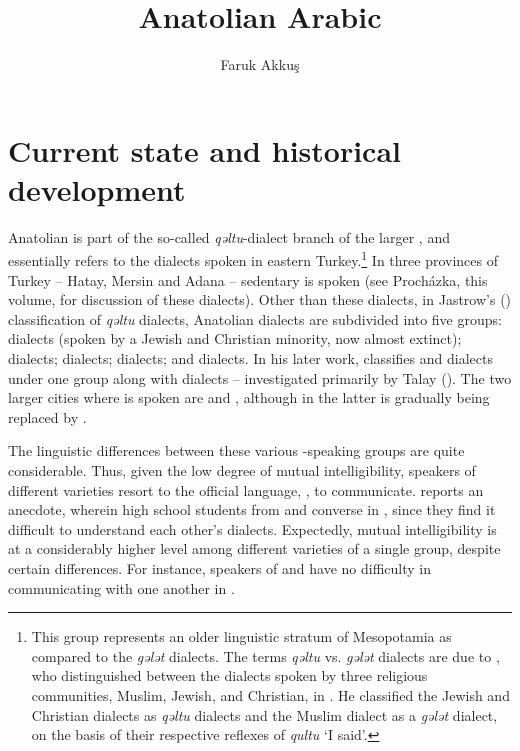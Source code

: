 \documentclass[output=paper]{langsci/langscibook}
\title{Anatolian Arabic}
\author{Faruk Akkuş\affiliation{University of Pennsylvania}}
\begin{document}
\maketitle

\section{Current state and historical development}

Anatolian  is part of the so-called \textit{qəltu}-dialect branch of the larger  , and essentially refers to the  dialects spoken in eastern Turkey.\footnote{This group represents an older linguistic stratum of Mesopotamia as compared to the \textit{gələt} dialects. The terms \textit{qəltu} vs. \textit{gələt} dialects are due to \cite{Blanc1964}, who distinguished between the  dialects spoken by three religious communities,
Muslim, Jewish, and Christian, in . He classified the Jewish and
Christian dialects as \textit{qəltu} dialects and the Muslim dialect as a \textit{gələt} dialect, on the basis of their respective reflexes of   \textit{qultu} `I said'.} In three provinces of Turkey -- Hatay, Mersin and Adana --  sedentary  is spoken (see Proch\'{a}zka, this volume, for discussion of these dialects). Other than these dialects, in Jastrow's (\citeyear{Jastrow1978}) classification of  \textit{qəltu} dialects, Anatolian  dialects are subdivided into five groups:
 dialects (spoken by a Jewish and Christian minority, now almost extinct);  dialects;  dialects;  dialects; and  dialects.
In his later work, \citet{Jastrow2011anatolian} classifies  and  dialects under one group along with  dialects -- investigated primarily by Talay (\citeyear{Talay2001,Talay2002}). The two larger cities where  is spoken are  and , although in the latter  is gradually being replaced by .

The linguistic differences between these various -speaking groups are quite considerable. Thus, given the low degree of mutual intelligibility, speakers of different varieties resort to the official language, , to communicate. \citet{Jastrow2006} reports an anecdote, wherein high school students from  and  converse in , since they find it difficult to understand each other's dialects. Expectedly, mutual intelligibility is at a considerably higher level among different varieties of a single group, despite certain differences. For instance,  speakers of  and   have no difficulty in communicating with one another in .
\end{document}

